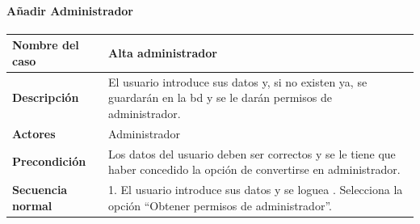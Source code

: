 \paragraph{Añadir Administrador}
\begin{table}[H]
    \centering
    \small
    \begin{tabularx}{0.8\textwidth}{|p{3.5cm}|X|}
        \hline
        \rowcolor{lightgray}
        \textbf{Nombre del caso}  & \textbf{Alta administrador}                                                                                                                                                                                                                                                                                                                         \\
        \hline
        \textbf{Descripción}      & El usuario introduce sus datos y, si no existen ya, se guardarán en la \gls{bd} y se le darán permisos de administrador.                                                                                                                                                                                                                            \\
        \hline
        \textbf{Actores}          & Administrador                                                                                                                                                                                                                                                                                                                                       \\
        \hline
        \textbf{Precondición}     & Los datos del usuario deben ser correctos y se le tiene que haber concedido la opción de convertirse en administrador.                                                                                                                                                                                                                              \\
        \hline
        \textbf{Secuencia normal} & 1. El usuario introduce sus datos y se loguea \newline
        2. Selecciona la opción ``Obtener permisos de administrador''.                                                                                                                                                                                                                                                                                                                  \\

\end{tabularx}
\end{table}

